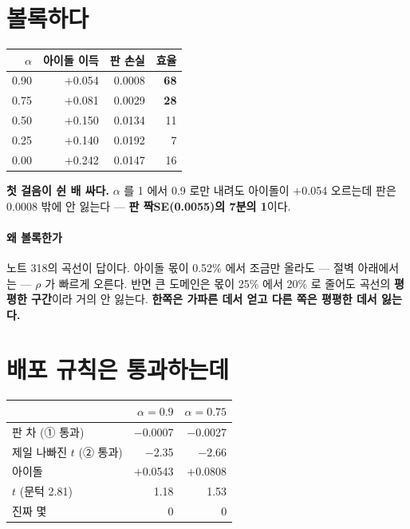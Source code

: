 \documentclass[10pt]{article}
\begin{document}
\section{볼록하다}

\begin{center}\small
\begin{tabular}{rrrr}
\hline
$\alpha$ & 아이돌 이득 & 판 손실 & 효율 \\
\hline
0.90 & $+$0.054 & 0.0008 & \textbf{68} \\
0.75 & $+$0.081 & 0.0029 & \textbf{28} \\
0.50 & $+$0.150 & 0.0134 & 11 \\
0.25 & $+$0.140 & 0.0192 & 7 \\
0.00 & $+$0.242 & 0.0147 & 16 \\
\hline
\end{tabular}
\end{center}

\textbf{첫 걸음이 쉰 배 싸다.} $\alpha$ 를 1 에서 0.9 로만 내려도 아이돌이
$+$0.054 오르는데 판은 0.0008 밖에 안 잃는다 --- \textbf{판 짝SE(0.0055)의
7분의 1}이다.

\paragraph{왜 볼록한가} 노트 318의 곡선이 답이다. 아이돌 몫이 0.52\% 에서
조금만 올라도 --- 절벽 아래에서는 --- $\rho$ 가 빠르게 오른다. 반면 큰
도메인은 몫이 25\% 에서 20\% 로 줄어도 곡선의 \textbf{평평한 구간}이라 거의
안 잃는다. \textbf{한쪽은 가파른 데서 얻고 다른 쪽은 평평한 데서 잃는다.}

\section{배포 규칙은 통과하는데}

\begin{center}\footnotesize
\begin{tabular}{lrr}
\hline
& $\alpha{=}0.9$ & $\alpha{=}0.75$ \\
\hline
판 차 (① 통과) & $-$0.0007 & $-$0.0027 \\
제일 나빠진 $t$ (② 통과) & $-$2.35 & $-$2.66 \\
아이돌 & $+$0.0543 & $+$0.0808 \\
\quad $t$ (문턱 2.81) & 1.18 & 1.53 \\
진짜 몇 & 0 & 0 \\
\hline
\end{tabular}
\end{center}
\end{document}
